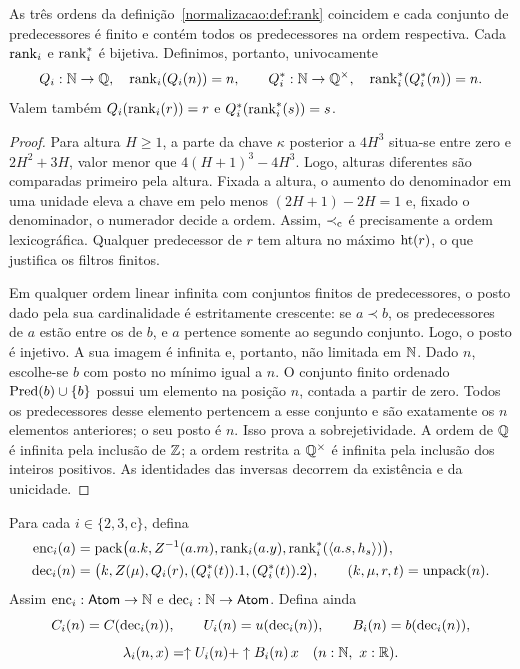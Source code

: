 \begin{lema}\label{map:normalizacao:4.5}\label{normalizacao:lem:rank}
As três ordens da definição~\ref{normalizacao:def:rank} coincidem e cada conjunto
de predecessores é finito e contém todos os predecessores na ordem
respectiva. Cada $\operatorname{rank}_i$ e $\operatorname{rank}_i^*$ é bijetiva.
Definimos, portanto, univocamente
\[
 Q_i:\mathbb N\to\mathbb Q,\quad\operatorname{rank}_i(Q_i(n))=n,
 \qquad Q_i^*:\mathbb N\to\mathbb Q^{\times},\quad\operatorname{rank}_i^*(Q_i^*(n))=n.
\]
Valem também $Q_i(\operatorname{rank}_i(r))=r$ e
$Q_i^*(\operatorname{rank}_i^*(s))=s$.
\end{lema}
\begin{proof}
Para altura $H\ge1$, a parte da chave $\kappa$ posterior a $4H^3$
situa-se entre zero e $2H^2+3H$, valor menor que
$4(H+1)^3-4H^3$. Logo, alturas diferentes são comparadas primeiro
pela altura. Fixada a altura, o aumento do denominador em uma unidade eleva
a chave em pelo menos $(2H+1)-2H=1$ e, fixado o denominador, o
numerador decide a ordem. Assim, $\prec_{\rm c}$ é precisamente a
ordem lexicográfica. Qualquer predecessor de $r$ tem altura no
máximo $\operatorname{ht}(r)$, o que justifica os filtros finitos.

Em qualquer ordem linear infinita com conjuntos finitos de
predecessores, o posto dado pela sua cardinalidade é estritamente
crescente: se $a\prec b$, os predecessores de $a$ estão entre os de
$b$, e $a$ pertence somente ao segundo conjunto. Logo, o posto é
injetivo. A sua imagem é infinita e, portanto, não limitada em $\mathbb N$.
Dado $n$, escolhe-se $b$ com posto no mínimo igual a $n$. O conjunto finito
ordenado $\operatorname{Pred}(b)\cup\{b\}$ possui um elemento na posição $n$,
contada a partir de zero. Todos os predecessores desse elemento
pertencem a esse conjunto e são exatamente os $n$ elementos
anteriores; o seu posto é $n$. Isso prova a sobrejetividade.
A ordem de $\mathbb Q$ é infinita pela inclusão de $\mathbb Z$; a ordem restrita a
$\mathbb Q^{\times}$ é infinita pela inclusão dos inteiros positivos.
As identidades das inversas decorrem da existência e da unicidade.
\end{proof}

\begin{definicao}\label{map:normalizacao:4.6}\label{normalizacao:def:codec}
Para cada $i\in\{2,3,\mathrm c\}$, defina
\begin{align*}
 \operatorname{enc}_i(a)&=\operatorname{pack}
    \bigl(a.k,Z^{-1}(a.m),\operatorname{rank}_i(a.y),
                     \operatorname{rank}_i^*(\langle a.s,h_s\rangle)\bigr),\\
 \operatorname{dec}_i(n)&=
 \bigl(k,Z(\mu),Q_i(r),(Q_i^*(t)).1,(Q_i^*(t)).2\bigr),
 \qquad (k,\mu,r,t)=\operatorname{unpack}(n).
\end{align*}
Assim $\operatorname{enc}_i:\mathsf{Atom}\to\mathbb N$ e $\operatorname{dec}_i:\mathbb N\to\mathsf{Atom}$.
Defina ainda
\[
 C_i(n)=C(\operatorname{dec}_i(n)),\qquad
 U_i(n)=u(\operatorname{dec}_i(n)),\qquad B_i(n)=b(\operatorname{dec}_i(n)),
\]
\[
 \lambda_i(n,x)=\uparrow U_i(n)+\uparrow B_i(n)\,x
 \quad(n:\mathbb N,\ x:\mathbb R).
\]
\end{definicao}

